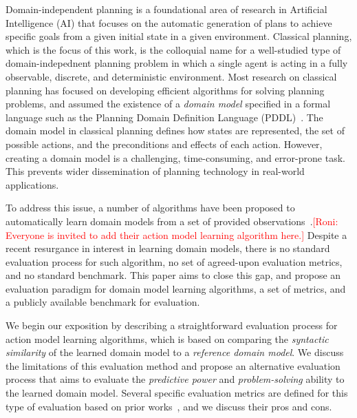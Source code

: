 \documentclass{article}
\theoremstyle{definition}
\theoremstyle{remark}
\newcommand{\roni}[1]{{\textcolor{red}{[Roni: #1]}}}
\begin{document}
Domain-independent planning is a foundational area of research in Artificial Intelligence (AI) that focuses on the automatic generation of plans to achieve specific goals from a given initial state in a given environment. Classical planning, which is the focus of this work, is the colloquial name for a well-studied type of domain-indepednent planning problem in which a single agent is acting in a fully observable, discrete, and deterministic environment. 
Most research on classical planning has focused on developing efficient algorithms for solving planning problems, and assumed the existence of a \emph{domain model} specified in a formal language such as the Planning Domain Definition Language (PDDL)~\cite{pddl}. 
The domain model in classical planning defines how states are represented, the set of possible actions, and the preconditions and effects of each action. 
However, creating a domain model is a challenging, time-consuming, and error-prone task.
This prevents wider dissemination of planning technology in real-world applications. 

To address this issue, a number of algorithms have been proposed to automatically learn domain models from a set of provided observations~\cite{xi2024neuro,juba2021safe,mordoch2024safe}.\roni{Everyone is invited to add their action model learning algorithm here.}
Despite a recent resurgance in interest in learning domain models, there is no standard evaluation process for such algorithm, 
no set of agreed-upon evaluation metrics, and no standard benchmark. 
This paper aims to close this gap, and propose an evaluation paradigm for domain model learning algorithms, a set of metrics, and a publicly available benchmark for evaluation. 


We begin our exposition by describing a straightforward evaluation process for action model learning algorithms, which is based on comparing the \emph{syntactic similarity} of the learned domain model to a \emph{reference domain model}. We discuss the limitations of this evaluation method and propose an alternative evaluation process that aims to evaluate the \emph{predictive power} and \emph{problem-solving} ability to the learned domain model. 
Several specific evaluation metrics are defined for this type of evaluation based on prior works~\cite{aineto2019learning,juba2021safe,mordoch2024safe}, and we discuss their pros and cons. 
\end{document}
